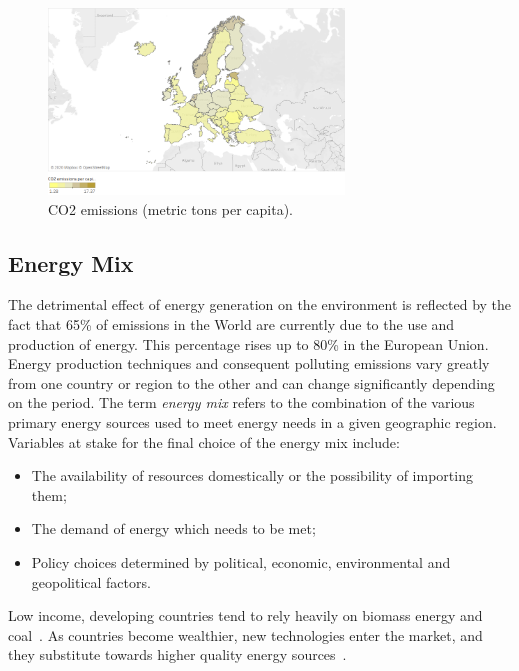 \documentclass[a4paper,12pt]{book}
\begin{document}
\begin{figure}[tb]
\begin{center}
\captionsetup{justification=centering}
\includegraphics[width=0.7\textwidth]{Images/intensiti.png}
\caption{CO2 emissions (metric tons per capita).}
\label{fig:intensiti}
\end{center}
\end{figure}

\subsection*{Energy Mix}

The detrimental effect of energy generation on the environment is reflected by the fact that 65\% of emissions in the World are currently due to the use and production of energy. This percentage rises up to 80\% in the European Union.~\cite{marrero2010greenhouse} Energy production techniques and consequent polluting emissions vary greatly from one country or region to the other and can change significantly depending on the period. The term \textit{energy mix} refers to the combination of the various primary energy sources used to meet energy needs in a given geographic region. Variables at stake for the final choice of the energy mix include:

\begin{itemize}

\item The availability of resources domestically or the possibility of importing them;
\item The demand of energy which needs to be met;
\item Policy choices determined by political, economic, environmental and geopolitical factors.

\end{itemize}

Low income, developing countries tend to rely heavily on biomass energy and coal~\cite{international2009energy}. As countries become wealthier, new technologies enter the market, and they substitute towards higher quality energy sources~\cite{csereklyei2016energy}.
\end{document}
